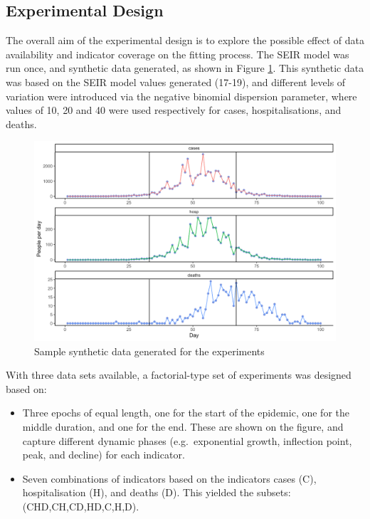 \documentclass[10pt,letterpaper]{article}
\begin{document}
\hypertarget{experimental-design}{%
\subsection{Experimental Design}\label{experimental-design}}

The overall aim of the experimental design is to explore the possible effect of data availability and indicator coverage on the fitting process. The SEIR model was run once, and synthetic data generated, as shown in Figure \ref{fig:sys-syn}. This synthetic data was based on the SEIR model values generated (17-19), and different levels of variation were introduced via the negative binomial dispersion parameter, where values of 10, 20 and 40 were used respectively for cases, hospitalisations, and deaths.

\begin{figure}
\includegraphics[width=0.85\linewidth]{diagrams/sys_synthetic} \caption{Sample synthetic data generated for the experiments}\label{fig:sys-syn}
\end{figure}

With three data sets available, a factorial-type set of experiments was designed based on:

\begin{itemize}
\item
  Three epochs of equal length, one for the start of the epidemic, one for the middle duration, and one for the end. These are shown on the figure, and capture different dynamic phases (e.g.~exponential growth, inflection point, peak, and decline) for each indicator.
\item
  Seven combinations of indicators based on the indicators cases (C), hospitalisation (H), and deaths (D). This yielded the subsets: (CHD,CH,CD,HD,C,H,D).
\end{itemize}
\end{document}
